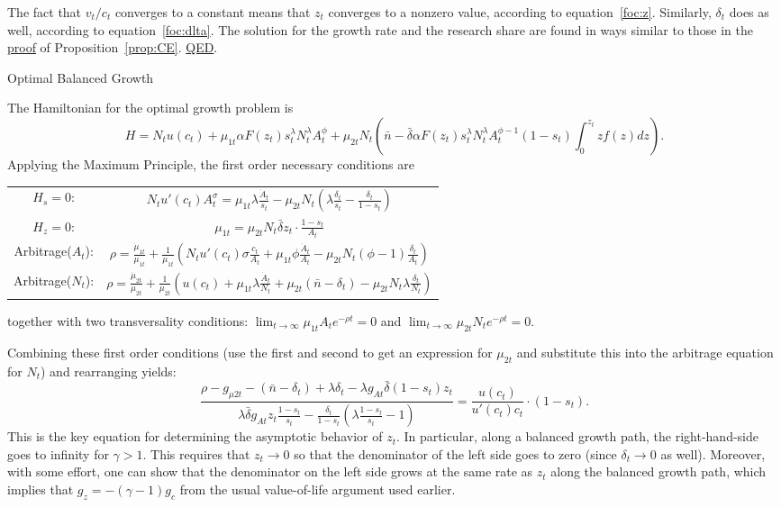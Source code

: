 \documentclass[12pt,twoside]{article}
\newcommand{\growth}[1]{\frac{\dot{#1}_t}{{#1}_t}}
\newcommand{\clr}[1]{{\color{ChadBlue} #1}}
\newcommand{\Proof}[2]{\newline {\hspace{-\parindent} {\color{ChadGreen}\bf Proof of Proposition}~\ref{#1}.}
{\color{ChadBlue} #2} \vspace{.1in}}
\begin{document}
The fact that $v_t/c_t$ converges to a constant means that $z_t$
converges to a nonzero value, according to equation~\eqref{foc:z}.
Similarly, $\delta_t$ does as well, according to
equation~\eqref{foc:dlta}. The solution for the growth rate and the
research share are found in ways similar to those in the
\hyperlink{proof:CE}{proof} of Proposition~\ref{prop:CE}.
\hyperlink{prop:gamma}{QED}.


\hypertarget{proof:swf}{}
\Proof{prop:swf}{Optimal Balanced Growth}

The Hamiltonian for the optimal growth problem is
\[
H=N_t u(c_t) + \mu_{1t} \alpha F(z_t) s_t ^\lambda N_t ^\lambda A_t^\phi 
 + \mu_{2t} N_t \left( \bar{n}-\bar{\delta} \alpha F(z_t) s_t ^\lambda N_t ^\lambda A_t^{\phi-1} 
 (1-s_t) \int_0 ^{z_t} zf(z)dz  \right).
\]
Applying the Maximum Principle, the first order necessary conditions are\\
\begin{tabular*}{\textwidth}{cc}
\clr{$H_s=0$:} & $N_t u'(c_t) A_t ^\sigma = \mu_{1t} \lambda
\frac{\dot{A}_t}{s_t} - \mu_{2t} N_t ( \lambda \frac{\delta_t}{s_t} - \frac{\delta_t}{1-s_t})$\\
\clr{$H_z=0$:} & $\mu_{1t}=\mu_{2t} N_t \bar\delta z_t \cdot \frac{1-s_t}{A_t}$\\
\clr{Arbitrage($A_t$):} & $\rho=\frac{\dot\mu_{1t}}{\mu_{1t}} + \frac{1}{\mu_{1t}}
\left( N_t u'(c_t) \sigma \frac{c_t}{A_t} + \mu_{1t} \phi \growth{A} -
\mu_{2t} N_t (\phi-1) \frac{\delta_t}{A_t} \right)$\\
\clr{Arbitrage($N_t$):} & $\rho=\frac{\dot\mu_{2t}}{\mu_{2t}} +
\frac{1}{\mu_{2t}}
\left( u(c_t)+\mu_{1t} \lambda
\frac{\dot{A}_t}{N_t}+\mu_{2t}(\bar{n}-\delta_t)-\mu_{2t} N_t \lambda \frac{\delta_t}{N_t} \right)$
\end{tabular*}
together with two transversality conditions: $\lim_{t \rightarrow
  \infty} \mu_{1t} A_t e^{-\rho t}=0$ and $\lim_{t \rightarrow
  \infty} \mu_{2t} N_t e^{-\rho t}=0$.

Combining these first order conditions (use the first and second to get
an expression for $\mu_{2t}$ and substitute this into the arbitrage
equation for $N_t$) and rearranging yields:
\begin{equation}
\frac{ \rho-g_{\mu2t}-(\bar{n}-\delta_t) + \lambda \delta_t - \lambda g_{At}
  \bar\delta (1-s_t) z_t  }  %
{ \lambda \bar\delta g_{At} z_t \frac{1-s_t}{s_t} -
  \frac{\delta_t}{1-s_t}
  (\lambda \frac{1-s_t}{s_t}-1)  }  %
= \frac{u(c_t)}{u'(c_t)c_t} \cdot (1-s_t).
\end{equation}
This is the key equation for determining the asymptotic behavior of
$z_t$. In particular, along a balanced growth path, the right-hand-side
goes to infinity for $\gamma>1$. This requires that $z_t \rightarrow 0$
so that the denominator of the left side goes to zero (since $\delta_t
\rightarrow 0$ as well).  Moreover, with some effort, one can show that
the denominator on the left side grows at the same rate as $z_t$ along
the balanced growth path, which implies that $g_z=-(\gamma-1) g_c$ from
the usual value-of-life argument used earlier.
\end{document}
